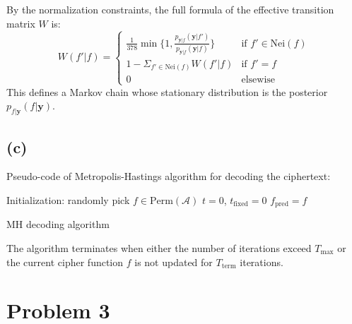 \documentclass[12pt,aps,pre,reprint]{revtex4-1}
\begin{document}
By the normalization constraints, the full formula of the effective transition matrix $W$ is:
\begin{equation}
W(f'|f) =
\begin{cases}
\frac{1}{378}\min\big\{1, \frac{p_{\mathbf{y}|f}(\mathbf{y}|f')}{p_{\mathbf{y}|f}(\mathbf{y}|f)}\big\} & \text{if }f'\in \text{Nei}(f)\\ 1-\Sigma_{f'\in\text{Nei}(f)}W(f'|f) & \text{if }f'=f\\0 & \text{elsewise}
\end{cases}
\end{equation}
This defines a Markov chain whose stationary distribution is the posterior $p_{f|\mathbf{y}}(f|\mathbf{y})$.

\subsection{(c)}
Pseudo-code of Metropolis-Hastings algorithm for decoding the ciphertext:

\begin{widetext}
\begin{algorithm*}[H]
	\SetAlgoLined
	Initialization: randomly pick $f\in \text{Perm}(\mathcal{A})$\;
	$t=0$, $t_{\text{fixed}}=0$\;
	$f_{\text{pred}} = f$\;
	\caption{MH decoding algorithm}
\end{algorithm*}
\end{widetext}

The algorithm terminates when either the number of iterations exceed $T_\text{max}$ or the current cipher function $f$ is not updated for $T_\text{term}$ iterations.


\section{Problem 3}
\end{document}
